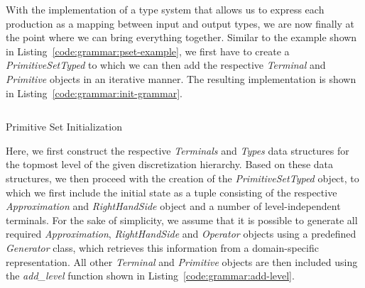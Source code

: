With the implementation of a type system that allows us to express each production as a mapping between input and output types, we are now finally at the point where we can bring everything together.
Similar to the example shown in Listing~\ref{code:grammar:pset-example}, we first have to create a \emph{PrimitiveSetTyped} to which we can then add the respective \emph{Terminal} and \emph{Primitive} objects in an iterative manner.
The resulting implementation is shown in Listing~\ref{code:grammar:init-grammar}.
\begin{listing}
	\inputminted[linenos]{python}{evostencils/grammar/init_grammar.py}
	\caption{Primitive Set Initialization}
	\label{code:grammar:init-grammar}
\end{listing}
Here, we first construct the respective \emph{Terminals} and \emph{Types} data structures for the topmost level of the given discretization hierarchy.
Based on these data structures, we then proceed with the creation of the \emph{PrimitiveSetTyped} object, to which we first include the initial state as a tuple consisting of the respective \emph{Approximation} and \emph{RightHandSide} object and a number of level-independent terminals.
For the sake of simplicity, we assume that it is possible to generate all required \emph{Approximation}, \emph{RightHandSide} and \emph{Operator} objects using a predefined \emph{Generator} class, which retrieves this information from a domain-specific representation.
All other \emph{Terminal} and \emph{Primitive} objects are then included using the \emph{add\_level} function shown in Listing~\ref{code:grammar:add-level}.

